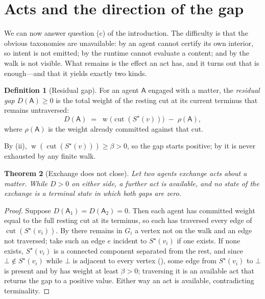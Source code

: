 \documentclass[11pt,a4paper]{article}
\theoremstyle{clstyle}
\newtheorem{theorem}{Theorem}[section]
\theoremstyle{definition}
\newtheorem{definition}[theorem]{Definition}
\theoremstyle{remark}
\DeclareMathOperator{\wt}{w}
\DeclareMathOperator{\cut}{cut}
\newcommand{\flo}{\beta}
\newcommand{\Ag}{\mathsf{A}}
\newcommand{\term}{v}                    %
\newcommand{\gap}{D}                     %
\newcommand{\med}{\bot}                  %
\begin{document}
\section{Acts and the direction of the gap}
\label{sec:acts}

We can now answer question (c) of the introduction. The difficulty is that
the obvious taxonomies are unavailable: by  an agent
cannot certify its own interior, so intent is not emitted; by
 the runtime cannot evaluate a content; and by
 the walk is not visible. What remains is the effect an
act has, and it turns out that is enough---and that it yields exactly two
kinds.

\begin{definition}[Residual gap]
\label{def:gap}
For an agent $\Ag$ engaged with a matter, the \emph{residual gap}
$\gap(\Ag)\ge0$ is the total weight of the resting cut at its current
terminus that remains untraversed:
\begin{equation}
\gap(\Ag) \;=\; \wt\bigl(\cut(S^{\star}(\term))\bigr) \;-\; \rho(\Ag),
\end{equation}
where $\rho(\Ag)$ is the weight already committed against that cut.
\end{definition}

By (ii), $\wt(\cut(S^{\star}(\term)))\ge\flo>0$, so the
gap starts positive; by  it is never exhausted by any
finite walk.

\begin{theorem}[Exchange does not close]
\label{thm:forcedact}
Let two agents exchange acts about a matter. While $\gap>0$ on either side,
a further act is available, and no state of the exchange is a terminal state
in which both gaps are zero.
\end{theorem}

\begin{proof}
Suppose $\gap(\Ag_1)=\gap(\Ag_2)=0$. Then each agent has committed weight
equal to the full resting cut at its terminus, so each has traversed every
edge of $\cut(S^{\star}(\term_i))$. By  there remains
in $G_i$ a vertex not on the walk and an edge not traversed; take such an
edge $e$ incident to $S^{\star}(\term_i)$ if one exists. If none exists,
$S^{\star}(\term_i)$ is a connected component separated from the rest, and
since $\med\notin S^{\star}(\term_i)$ while $\med$ is adjacent to every
vertex (), some edge from $S^{\star}(\term_i)$ to
$\med$ is present and by  has weight at least $\flo>0$;
traversing it is an available act that returns the gap to a positive value.
Either way an act is available, contradicting terminality.
\end{proof}
\end{document}
